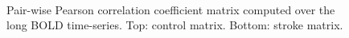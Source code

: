 \documentclass{tufte-handout}
\begin{document}
\begin{figure}%
  \\
  \caption{Pair-wise Pearson correlation coefficient matrix computed over the long BOLD time-series. Top: control matrix. Bottom: stroke matrix.}
  \label{fig:steps_sim_07}
\end{figure}
\end{document}
